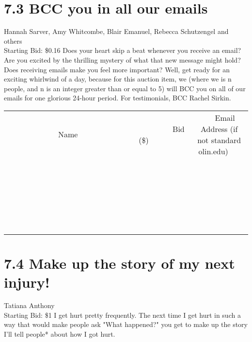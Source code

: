 \documentclass[11pt]{article}
\begin{document}
\section*{7.3 BCC you in all our emails}
Hannah Sarver, Amy Whitcombe, Blair Emanuel, Rebecca Schutzengel and others
\\
Starting Bid: \$0.16
\newline
Does your heart skip a beat whenever you receive an email? Are you excited by the thrilling mystery of what that new message might hold? Does receiving emails make you feel more important? Well, get ready for an exciting whirlwind of a day, because for this auction item, we (where we is n people, and n is an integer greater than or equal to 5) will BCC you on all of our emails for one glorious 24-hour period. For testimonials, BCC Rachel Sirkin.
\\[6ex]
\begin{tabular}{c c c}
~~~~~~~~~~~~~Name~~~~~~~~~~~~~ & ~~~~~~~~~Bid (\$)~~~~~~~~~  & ~~~Email Address (if not standard olin.edu)~~~\\
 & & \\
\hline
 & & \\
\hline
 & & \\
\hline
 & & \\
\hline
 & & \\
\hline
 & & \\
\hline
 & & \\
\hline
 & & \\
\hline
 & & \\
\hline
 & & \\
\hline
 & & \\
\hline
 & & \\
\hline
 & & \\
\hline
 & & \\
\hline
 & & \\
\hline
 & & \\
\hline
 & & \\
\hline
 & & \\
\hline
 & & \\
\hline
 & & \\
\hline
 & & \\
\hline
 & & \\
\hline
 & & \\
\hline
 & & \\
\hline
 & & \\
\hline
 & & \\
\hline
\end{tabular}
\newpage
\section*{7.4 Make up the story of my next injury!}
Tatiana Anthony
\\
Starting Bid: \$1
\newline
I get hurt pretty frequently.  The next time I get hurt in such a way that would make people ask "What happened?" you get to make up the story I'll tell people* about how I got hurt.
\end{document}

